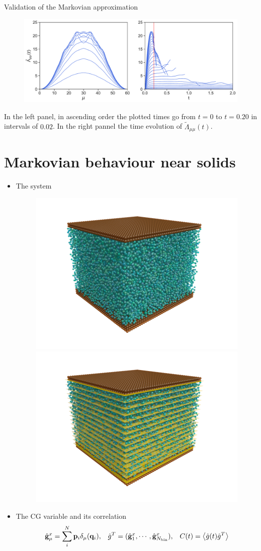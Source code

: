 \documentclass{beamer}
\newcommand{\llangle}{\left\langle}
\newcommand{\rrangle}{\right\rangle}
\begin{document}
\begin{frame}{Validation of the Markovian approximation}
\begin{figure}[h!]
\includegraphics[width=\linewidth]{LambdatFourier-PBC-defense}
\end{figure}
In  the left  panel, in
  ascending  order the  plotted times  go  from $t=0$  to $t=0.20$  in
  intervals of $0.02$.  In the right pannel the time evolution of $\tilde{\Lambda}_{\mu\mu}(t)$.
\end{frame}

\section{Markovian behaviour near solids}
\begin{frame}
\begin{itemize}
  \item The system
\begin{figure}
    \centering
    \includegraphics[width=0.45\linewidth]{PRL3_gold2_wo_layers_wo_diffuse}
    \includegraphics[width=0.45\linewidth]{PRL3_gold2_wo_diffuse}
\end{figure}
\item The CG variable and its correlation
\begin{align}
  \hat{\bf g}^x_\mu= \sum_i^N{\bf p}_i\delta_\mu({\bf q}_i), && 
  \hat{g}^T=(\hat{\bf   g}^x_1,\cdots,\hat{\bf  g}^x_{N_{\rm   bin}}), &&
  C(t)=\llangle \hat{g}(t) \hat{g}^T\rrangle 
\nonumber
\end{align}
\end{itemize}
\end{frame}
\end{document}
